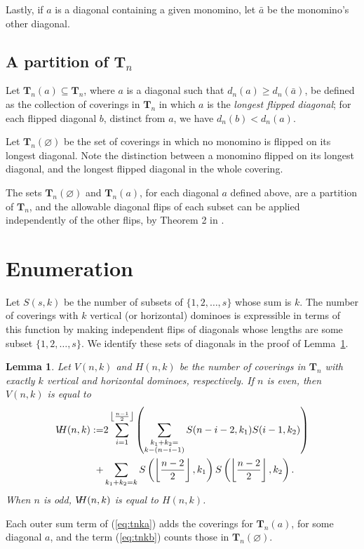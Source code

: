 \documentclass[12pt]{amsart}
\newtheorem{lemma}{Lemma}
\newcommand{\lref}[1]{Lemma~\ref{lem:#1}}
\newcommand\flr[2]{\left\lfloor \frac{#1}{#2} \right\rfloor}
\newcommand\ssum[1]{\sum_{ \substack{#1}}}
\newcommand{\Tn}[1]{\mathbf T_{#1}}
\newcommand{\vd}{V}
\newcommand{\hd}{H}
\newcommand{\vh}{V\hspace{-5pt}H}
\begin{document}
Lastly, if $a$ is a diagonal containing a given monomino, let $\bar a$
be the monomino's other diagonal.

\subsection{A partition of $\Tn{n}$}

Let $\Tn{n}(a)\subseteq \Tn{n}$, where $a$ is a diagonal such that
$d_n(a) \ge d_n(\bar a)$, be defined as the collection of coverings in
$\Tn{n}$ in which $a$ is the \emph{longest flipped diagonal}; for each
flipped diagonal $b$, distinct from $a$, we have $d_n(b)<d_n(a)$.

Let $\Tn{n}(\varnothing)$ be the set of coverings in which no monomino is
flipped on its longest diagonal.  Note the distinction between a
monomino flipped on its longest diagonal, and the longest flipped
diagonal in the whole covering.

The sets $\Tn{n}(\varnothing)$ and $\Tn{n}(a)$, for each diagonal $a$
defined above, are a partition of $\Tn{n}$, and the allowable diagonal
flips of each subset can be applied independently of the other flips,
by Theorem 2 in \cite{EricksonSchurch2012}.

\section{Enumeration}
\label{sec:enumeration}
Let $S(s,k)$ be the number of subsets of $\{1,2,\ldots, s\}$ whose sum
is $k$.  The number of coverings with $k$ vertical (or horizontal)
dominoes is expressible in terms of this function by making
independent flips of diagonals whose lengths are some subset
$\{1,2,\ldots, s\}$.  We identify these sets of diagonals in the proof
of \lref{vdominoes}.


\begin{lemma}
  \label{lem:vdominoes}
  Let $\vd(n,k)$ and $\hd(n,k)$ be the number of coverings in $\Tn{n}$
  with exactly $k$ vertical and horizontal dominoes, respectively.  If
  $n$ is even, then $\vd(n,k)$ is equal to
  \begin{subequations}
    \begin{align}
      \label{eq:tnka}%
      \vh(n,k) :=& 2\sum_{i=1}^{\flr{n-1}{2}} \left( \ssum{k_1+k_2 = \\k
          -(n-i-1)}
        S(n-i-2,k_1)S(i-1,k_2) \right)\\
      \label{eq:tnkb}%
      + & \sum_{k_1+k_2 = k}
      S\left(\flr{n-2}{2},k_1\right) S\left(\flr{n-2}{2},k_2\right).
    \end{align}
  \end{subequations}
  When $n$ is odd, $\vh(n,k)$ is equal to $\hd(n,k)$.
\end{lemma}
\proof Each outer sum term of (\ref{eq:tnka}) adds the coverings for
$\Tn{n}(a)$, for some diagonal $a$, and the term (\ref{eq:tnkb})
counts those in $\Tn{n}(\varnothing)$.
\end{document}
